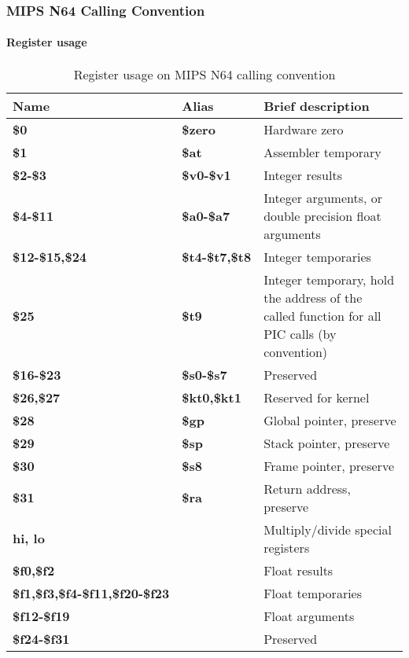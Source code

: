 \subsubsection{MIPS N64 Calling Convention}

\paragraph{Register usage}

\begin{table}[h]
\begin{tabular*}{0.95\textwidth}{lll}
Name                                   & Alias                & Brief description\\
\hline
{\bf \$0}                              & {\bf \$zero}         & Hardware zero \\
{\bf \$1}                              & {\bf \$at}           & Assembler temporary \\
{\bf \$2-\$3}                          & {\bf \$v0-\$v1}      & Integer results \\
{\bf \$4-\$11}                         & {\bf \$a0-\$a7}      & Integer arguments, or double precision float arguments\\
{\bf \$12-\$15,\$24}                   & {\bf \$t4-\$t7,\$t8} & Integer temporaries \\
{\bf \$25}                             & {\bf \$t9}           & Integer temporary, hold the address of the called function for all PIC calls (by convention) \\
{\bf \$16-\$23}                        & {\bf \$s0-\$s7}      & Preserved \\
{\bf \$26,\$27}                        & {\bf \$kt0,\$kt1}    & Reserved for kernel \\
{\bf \$28}                             & {\bf \$gp}           & Global pointer, preserve \\
{\bf \$29}                             & {\bf \$sp}           & Stack pointer, preserve \\
{\bf \$30}                             & {\bf \$s8}           & Frame pointer, preserve \\
{\bf \$31}                             & {\bf \$ra}           & Return address, preserve \\
{\bf hi, lo}                           &                      & Multiply/divide special registers \\
{\bf \$f0,\$f2}                        &                      & Float results \\
{\bf \$f1,\$f3,\$f4-\$f11,\$f20-\$f23} &                      & Float temporaries \\
{\bf \$f12-\$f19}                      &                      & Float arguments \\
{\bf \$f24-\$f31}                      &                      & Preserved \\%
\end{tabular*}
\caption{Register usage on MIPS N64 calling convention}
\end{table}

